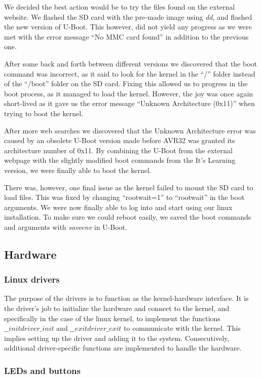 \documentclass[a4paper,12pt]{article}
\begin{document}
We decided the best action would be to try the files found on the external website. We flashed the SD card with the pre-made image using \emph{dd}, and flashed the new version of U-Boot. This however, did not yield any progress as we were met with the error message “No MMC card found” in addition to the previous one.

After some back and forth between different versions we discovered that the boot command was incorrect, as it said to look for the kernel in the “/” folder instead of the “/boot” folder on the SD card. Fixing this allowed us to progress in the boot process, as it managed to load the kernel. However, the joy was once again short-lived as it gave us the error message “Unknown Architecture (0x11)” when trying to boot the kernel.

After more web searches we discovered that the Unknown Architecture error was caused by an obsolete U-Boot version made before AVR32 was granted its architecture number of 0x11. By combining the U-Boot from the external webpage with the slightly modified boot commands from the It's Learning version, we were finally able to boot the kernel.

There was, however, one final issue as the kernel failed to mount the SD card to load files. This was fixed by changing “rootwait=1” to “rootwait” in the boot arguments. We were now finally able to log into and start using our linux installation. To make sure we could reboot easily, we saved the boot commands and arguments with \emph{saveenv} in U-Boot.

\subsection{Hardware}

\subsubsection{Linux drivers} %

The purpose of the drivers is to function as the kernel-hardware interface. It is the driver's job to initialize the hardware and connect to the kernel, and specifically in the case of the linux kernel, to implement the functions $\_\_init driver\_init$ and $\_\_exit driver\_exit$ to communicate with the kernel. This implies setting up the driver and adding it to the system. Consecutively, additional driver-specific functions are implemented to handle the hardware.

\subsubsection{LEDs and buttons} %
\end{document}
